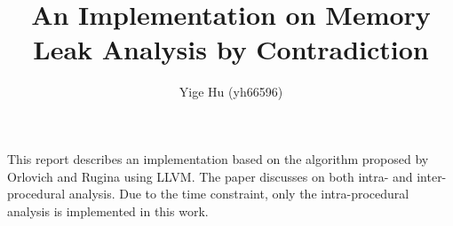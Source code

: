 \documentclass{article}
\title{\bf \Large An Implementation on Memory Leak Analysis by Contradiction}
\author{\normalsize Yige Hu (yh66596)}
\date{}
\newcommand{\llvm}[0]{LLVM\xspace}
\begin{document}
\maketitle


This report describes an implementation based on the algorithm proposed by
Orlovich and Rugina\cite{rugina} using \llvm. The paper discusses on both 
intra- and inter- procedural analysis. Due to the time constraint, only the
intra-procedural analysis is implemented in this work.

%

%



%

%


\footnotesize


\end{document}
